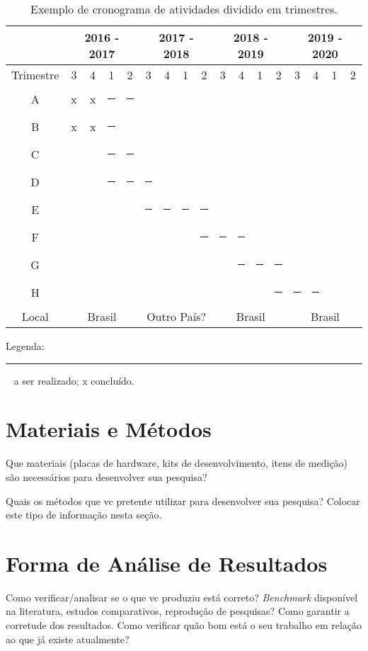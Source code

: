 \documentclass[12pt,a4paper]{article}
\newcommand{\ck}{\rule{8pt}{8pt}}
\begin{document}
\begin{table}[ht]
  \centering
  \caption{Exemplo de cronograma de atividades dividido em trimestres.
    \label{tab:cronograma}}
  \begin{tabular}{|c||c|c|c|c||c|c|c|c||c|c|c|c||c|c|c|c|}
    \hline
    & \multicolumn{4}{|c||}{2016 - 2017}
    & \multicolumn{4}{|c||}{2017 - 2018}
    & \multicolumn{4}{|c||}{2018 - 2019}
    & \multicolumn{4}{|c|}{2019 - 2020} \\ \hline \hline
    Trimestre & 3 & 4 & 1 & 2 & 3 & 4 & 1 & 2 & 3 & 4 & 1 & 2 &
      3 & 4 & 1 & 2 \\ \hline \hline
    A & x & x & \ck & \ck & & & & & & & & & & & & \\ \hline
    B & x & x & \ck &  & & & & & & & & & & & & \\ \hline
    C & & & \ck & \ck & & & & & & & & & & & & \\ \hline
    D & & & \ck & \ck & \ck & & & & & & & & & & & \\ \hline
    E & & & & & \ck & \ck & \ck & \ck & & & & & & & & \\ \hline
    F & & & & & & & & \ck & \ck & \ck & & & & & & \\ \hline
	  G & & & & & & & & & & \ck & \ck & \ck & & & & \\ \hline
	  H & & & & & & & & & & & & \ck & \ck & \ck & & \\ \hline
	  Local & \multicolumn{4}{|c||}{Brasil}
    & \multicolumn{4}{|c||}{Outro País?}
    & \multicolumn{4}{|c||}{Brasil}
    & \multicolumn{4}{|c|}{Brasil} \\ \hline
\end{tabular}
\end{table}

Legenda: \ck~ a ser realizado; x  concluído.


\section{Materiais e Métodos}
\label{sec:materiais-metodos}
Que materiais (placas de hardware, kits de desenvolvimento, itens de medição) são necessários para desenvolver sua pesquisa?

Quais os métodos que vc pretente utilizar para desenvolver sua pesquisa? Colocar este tipo de informação nesta seção.

\section{Forma de Análise de Resultados}
\label{sec:analise-resultados}
Como verificar/analisar se o que vc produziu está correto? \textit{Benchmark} disponível na literatura, estudos comparativos, reprodução de pesquisas? Como garantir a corretude dos resultados. Como verificar quão bom está o seu trabalho em relação ao que já existe atualmente?
\end{document}
